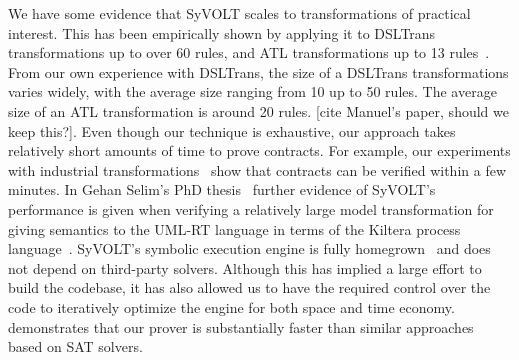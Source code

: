 We have some evidence that SyVOLT scales to transformations of practical
interest. This has been empirically shown by applying it to DSLTrans
transformations up to over 60 rules, and ATL transformations up to 13
rules~\cite{Oakes}. From our own experience with DSLTrans, the size of a
DSLTrans transformations varies widely, with the average size ranging from 10 up
to 50 rules. The average size of an ATL transformation is around 20 rules. [cite
Manuel's paper, should we keep this?]. Even though our technique is exhaustive, our
approach takes relatively short amounts of time to prove contracts. For example,
our experiments with industrial transformations~\cite{Oakes} show that contracts
can be verified within a few minutes. In Gehan Selim's PhD
thesis~\cite{Selim2015} further evidence of SyVOLT's performance is given when
verifying a relatively large model transformation for giving semantics to the
UML-RT language in terms of the Kiltera process language~\cite{PosseDingel2014}.
SyVOLT's symbolic execution engine is fully
homegrown~\cite{LucioVang} and does not depend on third-party solvers. Although this has implied
a large effort to build the codebase, it has also allowed us to have the
required control over the code to iteratively optimize the engine for both space
and time economy.
\cite{Selim2014} demonstrates that our prover is substantially faster than
similar approaches based on SAT solvers.